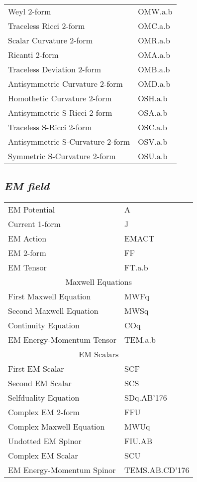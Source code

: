 \documentclass[twocolumn]{article}
\newcommand{\grgtt}{\ttfamily}
\renewcommand{\tt}{\grgtt}
\newcommand{\cc}{{\tt \char'176}}           %
\begin{document}
\begin{tabular}{|l|l|}
\tt    Weyl 2-form                     &\tt    OMW.a.b \\
\tt    Traceless Ricci 2-form          &\tt    OMC.a.b \\
\tt    Scalar Curvature 2-form         &\tt    OMR.a.b \\
\tt    Ricanti 2-form                  &\tt    OMA.a.b \\
\tt    Traceless Deviation 2-form      &\tt    OMB.a.b \\
\tt    Antisymmetric Curvature 2-form  &\tt    OMD.a.b \\
\tt    Homothetic Curvature 2-form     &\tt    OSH.a.b \\
\tt    Antisymmetric S-Ricci 2-form    &\tt  OSA.a.b  \\
\tt    Traceless S-Ricci 2-form        &\tt  OSC.a.b  \\
\tt    Antisymmetric S-Curvature 2-form &\tt  OSV.a.b  \\
\tt    Symmetric S-Curvature 2-form     &\tt  OSU.a.b  \\
\hline
\end{tabular}


\subsection{\sf\slshape  EM field}
\begin{tabular}{|l|l|}\hline
\tt    EM Potential    &\tt    A\\
\tt    Current 1-form  &\tt    J\\
\tt    EM Action       &\tt    EMACT\\
\tt    EM 2-form       &\tt    FF\\
\tt    EM Tensor       &\tt    FT.a.b\\
\hline
\multicolumn{2}{|c|}{\tt    Maxwell Equations}\\
\tt    First Maxwell Equation    &\tt    MWFq\\
\tt    Second Maxwell Equation   &\tt    MWSq\\
\hline
\tt    Continuity Equation       &\tt  COq\\
\tt    EM Energy-Momentum Tensor &\tt  TEM.a.b\\
\hline
\multicolumn{2}{|c|}{\tt    EM Scalars}\\
\tt    First EM Scalar         &\tt      SCF\\
\tt    Second EM Scalar        &\tt      SCS\\
\hline
\tt    Selfduality Equation    &\tt    SDq.AB\cc\\
\tt    Complex EM 2-form        &\tt   FFU\\
\tt    Complex Maxwell Equation &\tt   MWUq\\
\tt    Undotted EM Spinor       &\tt   FIU.AB\\
\tt    Complex EM Scalar        &\tt   SCU\\
\tt    EM Energy-Momentum Spinor &\tt  TEMS.AB.CD\cc\\
\hline\end{tabular}
\end{document}
